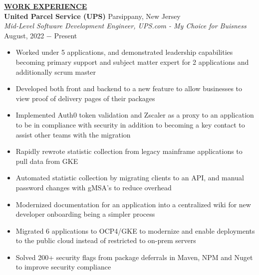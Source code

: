 \documentclass{article}
\begin{document}
% 
%
\noindent \textbf{\underline{WORK EXPERIENCE}} \\
\noindent \textbf{United Parcel Service (UPS)} \hfill Parsippany, New Jersey \\
\textit{Mid-Level Software Development Engineer, UPS.com - My Choice for Buisness} \hfill August, 2022 $-$ Present
\begin{itemize}[noitemsep,nolistsep,leftmargin=*]
\item {Worked under 5 applications, and demonstrated leadership capabilities becoming primary support and subject matter expert for 2 applications and additionally scrum master}
\item {Developed both front and backend to a new feature to allow businesses to view proof of delivery pages of their packages }
\item {Implemented Auth0 token validation and Zscaler as a proxy to an application to be in compliance with security in addition to becoming a key contact to assist other teams with the migration}
\item {Rapidly rewrote statistic collection from legacy mainframe applications to pull data from GKE}
\item {Automated statistic collection by migrating clients to an API, and manual password changes with gMSA's to reduce overhead}
\item {Modernized documentation for an application into a centralized wiki for new developer onboarding being a simpler process}
\item {Migrated 6 applications to OCP4/GKE to modernize and enable deployments to the public cloud instead of restricted to on-prem servers}
\item {Solved 200+ security flags from package deferrals in Maven, NPM and Nuget to improve security compliance}\\
\end{itemize}
\end{document}
